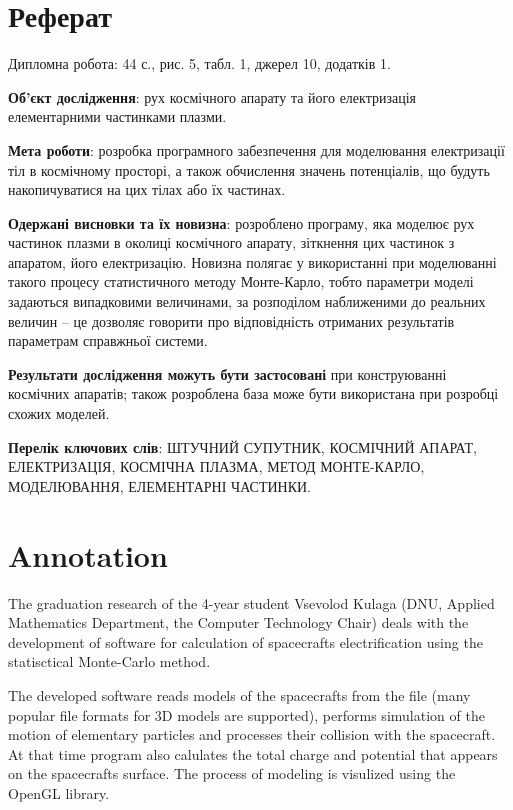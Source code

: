 \documentclass[a4paper,12pt]{article}
\begin{document}
\onehalfspacing
\large

\setcounter{page}{2}

\section*{Реферат}
Дипломна робота: 44 с., рис. 5, табл. 1, джерел 10, додатків 1.

\textbf{Об’єкт дослідження}: рух космічного апарату та його електризація елементарними частинками плазми.

\textbf{Мета роботи}: розробка програмного забезпечення для моделювання електризації тіл в космічному просторі, а також обчислення значень потенціалів, що будуть накопичуватися на цих тілах або їх частинах.

\textbf{Одержані висновки та їх новизна}: розроблено програму, яка моделює рух частинок плазми в околиці космічного апарату, зіткнення цих частинок з апаратом, його електризацію. Новизна полягає у використанні при моделюванні такого процесу статистичного методу Монте-Карло, тобто параметри моделі задаються випадковими величинами, за розподілом наближеними до реальних величин -- це дозволяє говорити про відповідність отриманих результатів параметрам справжньої системи.

\textbf{Результати дослідження можуть бути застосовані} при конструюванні космічних апаратів; також розроблена база може бути використана при розробці схожих моделей.

\textbf{Перелік ключових слів}: ШТУЧНИЙ СУПУТНИК, КОСМІЧНИЙ АПАРАТ, ЕЛЕКТРИЗАЦІЯ, КОСМІЧНА ПЛАЗМА, МЕТОД МОНТЕ-КАРЛО, МОДЕЛЮВАННЯ, ЕЛЕМЕНТАРНІ ЧАСТИНКИ.

\newpage

\section*{Annotation}

The graduation research of the 4-year student Vsevolod Kulaga (DNU, Applied Mathematics Department, the Computer Technology Chair) deals with the development of software for calculation of spacecrafts electrification using the statisctical Monte-Carlo method.
 
The developed software reads models of the spacecrafts from the file (many popular file formats for 3D models are supported), performs simulation of the motion of elementary particles and processes their collision with the spacecraft. At that time program also calulates the total charge and potential that appears on the spacecrafts surface. The process of modeling is visulized using the OpenGL library.
\end{document}
